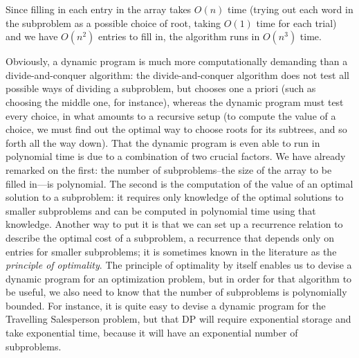 \documentclass[11pt]{article}
\begin{document}
Since filling in each entry in the array takes $O(n)$ time (trying out
each word in the subproblem as a possible choice of root, taking
$O(1)$ time for each trial) and we have $O(n^2)$ entries to fill in,
the algorithm runs in $O(n^3)$ time.

Obviously, a dynamic program is much more computationally demanding than
a divide-and-conquer algorithm: the divide-and-conquer algorithm
does not test all possible ways of dividing a subproblem, but chooses
one a priori (such as choosing the middle one, for instance), whereas
the dynamic program must test every choice, in what amounts to a recursive
setup (to compute the value of a choice, we must find out the optimal
way to choose roots for its subtrees, and so forth all the way down).
That the dynamic program is even able to run in polynomial time is due
to a combination of two crucial factors.  We have already remarked on the
first: the number of subproblems--the size of the array to be filled in---is
polynomial.  The second is the computation of the value of an optimal
solution to a subproblem: it requires only knowledge of the optimal
solutions to smaller subproblems and can be computed in polynomial time
using that knowledge.  Another way to put it is that we can set up a
recurrence relation to describe the optimal cost of a subproblem,
a recurrence that depends only on entries for smaller subproblems;
it is sometimes known in the literature as the \emph{principle of optimality}.
The principle of optimality by itself enables us to devise a dynamic
program for an optimization problem, but in order for that algorithm
to be useful, we also need to know that the number of subproblems
is polynomially bounded.  For instance, it is quite easy to devise
a dynamic program for the Travelling Salesperson problem, but that
DP will require exponential storage and take exponential time, because
it will have an exponential number of subproblems.
\end{document}
